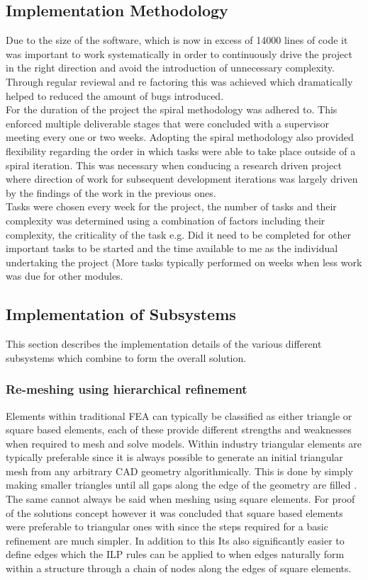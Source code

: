 \documentclass{article}
\begin{document}
\subsection{Implementation Methodology}
Due to the size of the software, which is now in excess of 14000 lines of code it was important to work systematically in order to continuously drive the project in the right direction and avoid the introduction of unnecessary complexity. Through regular reviewal and re factoring this was achieved which dramatically helped to reduced the amount of bugs introduced. \\

\noindent
For the duration of the project the spiral methodology was adhered to. This enforced multiple deliverable stages that were concluded with a supervisor meeting every one or two weeks. Adopting the spiral methodology also provided flexibility regarding the order in which tasks were able to take place outside of a spiral iteration. This was necessary when conducing a research driven project where direction of work for subsequent development iterations was largely driven by the  findings of the work in the previous ones. \\


\noindent
Tasks were chosen every week for the project, the number of tasks and their complexity was determined using a combination of factors including their complexity, the criticality of the task e.g. Did it need to be completed for other important tasks to be started and the time available to me as the individual undertaking the project (More tasks typically performed on weeks when less work was due for other modules.

\subsection{Implementation of Subsystems}
This section describes the implementation details of the various different subsystems which combine to form the overall solution.

\subsubsection{Re-meshing using hierarchical refinement}
Elements within traditional FEA can typically be classified as either triangle or square based elements, each of these provide different strengths and weaknesses when required to mesh and solve models. Within industry triangular elements are typically preferable since it is always possible to generate an initial triangular mesh from any arbitrary CAD geometry algorithmically. This is done by simply making smaller triangles until all gaps along the edge of the geometry are filled \cite{}. The same cannot always be said  when meshing using square elements. For proof of the solutions concept however it was concluded that square based elements were preferable to triangular ones with since the steps required for a basic refinement are much simpler. In addition to this Its also significantly easier to define edges which the ILP rules can be applied to when edges naturally form within a structure through a chain of nodes along the edges of square elements.
\end{document}

